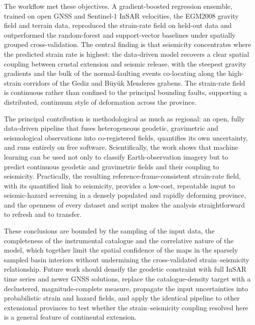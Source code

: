 \documentclass[pdflatex,sn-mathphys-num]{sn-jnl}%
\theoremstyle{thmstyleone}%
\theoremstyle{thmstyletwo}%
\theoremstyle{thmstylethree}%
\begin{document}
The workflow met these objectives. A gradient-boosted regression ensemble, trained on
open GNSS and Sentinel-1 InSAR velocities, the EGM2008 gravity field and terrain data,
reproduced the strain-rate field on held-out data and outperformed the random-forest
and support-vector baselines under spatially grouped cross-validation. The central
finding is that seismicity concentrates where the predicted strain rate is highest:
the data-driven model recovers a clear spatial coupling between crustal extension and
seismic release, with the steepest gravity gradients and the bulk of the
normal-faulting events co-locating along the high-strain corridors of the Gediz and
B\"{u}y\"{u}k Menderes grabens. The strain-rate field is continuous rather than
confined to the principal bounding faults, supporting a distributed, continuum style of
deformation across the province.

The principal contribution is methodological as much as regional: an open, fully
data-driven pipeline that fuses heterogeneous geodetic, gravimetric and seismological
observations into co-registered fields, quantifies its own uncertainty, and runs
entirely on free software. Scientifically, the work shows that machine learning can be
used not only to classify Earth-observation imagery but to predict continuous geodetic
and gravimetric fields and their coupling to seismicity. Practically, the resulting
reference-frame-consistent strain-rate field, with its quantified link to seismicity,
provides a low-cost, repeatable input to seismic-hazard screening in a densely
populated and rapidly deforming province, and the openness of every dataset and script
makes the analysis straightforward to refresh and to transfer.

These conclusions are bounded by the sampling of the input data, the completeness of
the instrumental catalogue and the correlative nature of the model, which together
limit the spatial confidence of the maps in the sparsely sampled basin interiors
without undermining the cross-validated strain--seismicity relationship. Future work
should densify the geodetic constraint with full InSAR time series and newer GNSS
solutions, replace the catalogue-density target with a declustered, magnitude-complete
measure, propagate the input uncertainties into probabilistic strain and hazard fields,
and apply the identical pipeline to other extensional provinces to test whether the
strain--seismicity coupling resolved here is a general feature of continental
extension.

\backmatter
\end{document}
